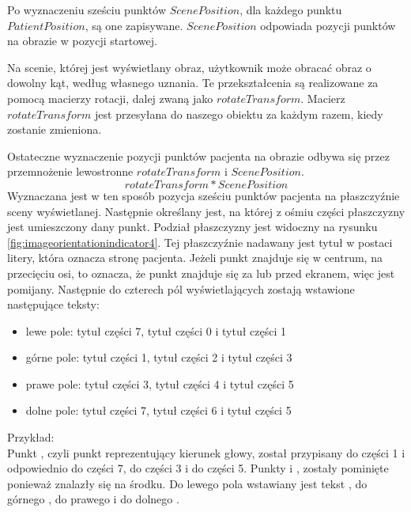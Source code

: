 \par
Po wyznaczeniu sześciu punktów $ScenePosition$, dla każdego punktu $PatientPosition$, są one zapisywane.
$ScenePosition$ odpowiada pozycji punktów na obrazie w pozycji startowej.

\par
Na scenie, której jest wyświetlany obraz, użytkownik może obracać obraz o dowolny kąt, według własnego uznania.
Te przekształcenia są realizowane za pomocą macierzy rotacji, dalej zwaną jako $rotateTransform$.
Macierz $rotateTransform$ jest przesyłana do naszego obiektu  za każdym razem, kiedy zostanie zmieniona.

\par
Ostateczne wyznaczenie pozycji punktów pacjenta na obrazie odbywa się przez przemnożenie lewostronne $rotateTransform$ i $ScenePosition$.
\[rotateTransform * ScenePosition\]
Wyznaczana jest w ten sposób pozycja sześciu punktów pacjenta na płaszczyźnie sceny wyświetlanej.
Następnie określany jest, na której z ośmiu części płaszczyzny jest umieszczony dany punkt.
Podział płaszczyzny jest widoczny na rysunku \ref{fig:imageorientationindicator4}.
Tej płaszczyźnie nadawany jest tytuł w postaci litery, która oznacza stronę pacjenta.
Jeżeli punkt znajduje się w centrum, na przecięciu osi, to oznacza, że punkt znajduje się za lub przed ekranem, więc jest pomijany.
Następnie do czterech pól wyświetlających zostają wstawione następujące teksty:
\begin{itemize}
    \item lewe pole: tytuł części 7, tytuł części 0 i tytuł części 1
    \item górne pole: tytuł części 1, tytuł części 2 i tytuł części 3
    \item prawe pole: tytuł części 3, tytuł części 4 i tytuł części 5
    \item dolne pole: tytuł części 7, tytuł części 6 i tytuł części 5
\end{itemize}

\par
Przykład:\\
Punkt , czyli punkt reprezentujący kierunek głowy, został przypisany do części 1 i odpowiednio  do części 7,  do części 3 i  do części 5.
Punkty  i , zostały pominięte ponieważ znalazły się na środku.
Do lewego pola wstawiany jest tekst , do górnego , do prawego  i do dolnego .

